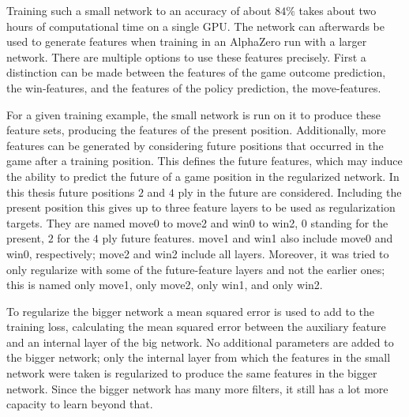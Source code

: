 \documentclass[12pt,onecolumn,oneside,titlepage]{article}
\begin{document}
Training such a small network to an accuracy of about $84\%$ takes about two hours of computational time on a single GPU. 
The network can afterwards be used to generate features when training in an AlphaZero run with a larger network.
There are multiple options to use these features precisely.
First a distinction can be made between the features of the game outcome prediction,
the win-features, and the features of the policy prediction, the move-features.

For a given training example, the small network is run on it to produce these feature sets, producing the features of the present position. Additionally,
more features can be generated by considering future positions that occurred in the game
after a training position. This defines the future features, which may induce the ability to predict the future of a game position in the regularized network. 
In this thesis future positions $2$ and $4$  ply in the future are considered.
Including the present position this gives up to three feature layers to be used as regularization targets. 
They are named move0 to move2 and win0 to win2, $0$ standing for the present, $2$ for the $4$ ply future features. move1 and win1 also include move0 and win0, respectively;
move2 and win2 include all layers. Moreover, it was tried to only regularize with some of the future-feature layers and not the earlier ones; this is named only move1, only move2, only win1, and only win2.

To regularize the bigger network a mean squared error is used to add to the training loss, calculating the mean squared error between the auxiliary feature and an internal layer of the big network. 
No additional parameters are added to the bigger network;
only the internal layer from which the features in the small network were taken is regularized 
to produce the same features in the bigger network. Since the bigger network has many more filters, it still has a lot more capacity to learn beyond that.
\end{document}
